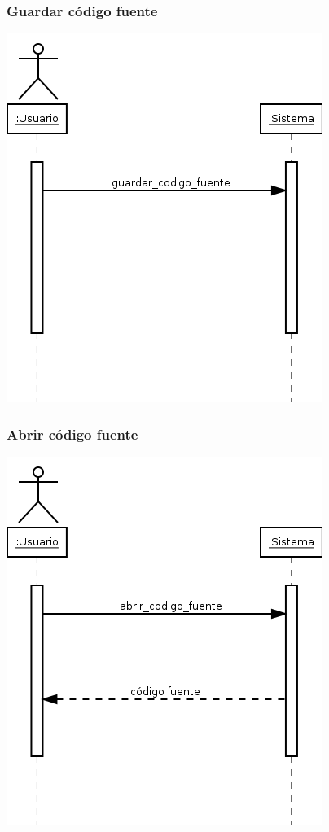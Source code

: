 \subsubsection{Guardar código fuente}
\begin{center}
\includegraphics[scale=0.4]{guardar_codigo_fuente.png} \\
\end{center}
\subsubsection{Abrir código fuente}
\begin{center}
\includegraphics[scale=0.4]{abrir_codigo_fuente.png} \\
\end{center}

